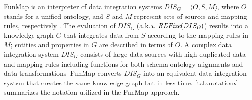 \begin{table}[h!]
\normalsize
\centering
\caption{Summary of the notation used for defining FunMap}
\label{tab:notations}
\end{table}
FunMap is an interpreter of data integration systems $DIS_G = \langle O,S,M \rangle$, where $O$ stands for a unified ontology, and $S$ and $M$ represent sets of sources and mapping rules, respectively \citep{Lenzerini02}. The evaluation of $DIS_G$ (a.k.a. $\emph{RDFize}(DIS_G)$) results into a knowledge graph $G$ that integrates data from $S$ according to the mapping rules in $M$; entities and properties in $G$ are described in terms of $O$. A complex data integration system $DIS_G$ consists of large data sources with high-duplicated data and mapping rules including functions for both schema-ontology alignments and data transformations. FunMap converts $DIS_G$ into an equivalent data integration system that creates the same knowledge graph but in less time. \autoref{tab:notations} summarizes the notation utilized in the FunMap approach.



